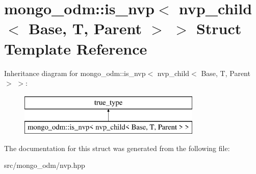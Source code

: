 \hypertarget{structmongo__odm_1_1is__nvp_3_01nvp__child_3_01Base_00_01T_00_01Parent_01_4_01_4}{}\section{mongo\+\_\+odm\+:\+:is\+\_\+nvp$<$ nvp\+\_\+child$<$ Base, T, Parent $>$ $>$ Struct Template Reference}
\label{structmongo__odm_1_1is__nvp_3_01nvp__child_3_01Base_00_01T_00_01Parent_01_4_01_4}
Inheritance diagram for mongo\+\_\+odm\+:\+:is\+\_\+nvp$<$ nvp\+\_\+child$<$ Base, T, Parent $>$ $>$\+:\begin{figure}[H]
\begin{center}
\leavevmode
\includegraphics[height=2.000000cm]{structmongo__odm_1_1is__nvp_3_01nvp__child_3_01Base_00_01T_00_01Parent_01_4_01_4}
\end{center}
\end{figure}


The documentation for this struct was generated from the following file\+:\begin{DoxyCompactItemize}
\item 
src/mongo\+\_\+odm/nvp.\+hpp\end{DoxyCompactItemize}
